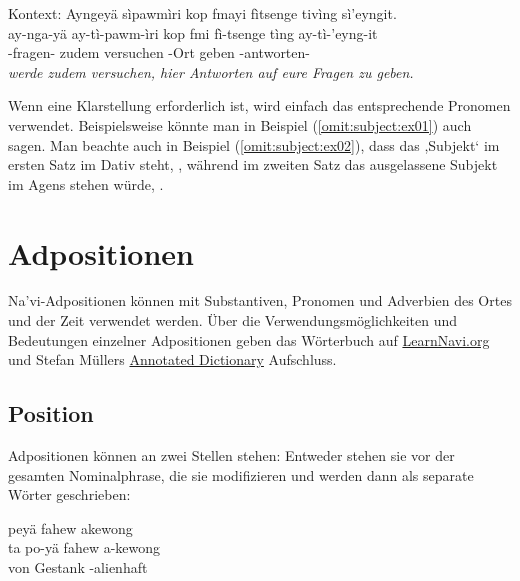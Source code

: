 \begin{interlin}
	Kontext:   
	\glll \Npawl{}Ayngeyä sìpawmìri kop fmayi fìtsenge tivìng sì'eyngit. \\
	ay-nga-yä ay-tì-pawm-ìri kop fmi fì-tsenge tìng ay-tì-'eyng-it \\
	 -fragen- zudem versuchen -Ort geben -antworten- \\
	\vskip-4pt\textit{ werde zudem versuchen, hier Antworten auf eure Fragen zu geben.}
\end{interlin}

\noindent Wenn eine Klarstellung erforderlich ist, wird einfach das entsprechende Pronomen verwendet. Beispielsweise könnte man in Beispiel (\ref{omit:subject:ex01}) auch  sagen. Man beachte auch in Beispiel (\ref{omit:subject:ex02}), dass das ,Subjekt‘ im ersten Satz im Dativ steht, , während im zweiten Satz das ausgelassene Subjekt im Agens stehen würde, .


\section{Adpositionen}
\noindent Na'vi-Adpositionen können mit Substantiven, Pronomen und Adverbien des Ortes und der Zeit verwendet werden. Über die Verwendungsmöglichkeiten und Bedeutungen einzelner Adpositionen geben das Wörterbuch auf \href{https://learnnavi.org/navi-vocabulary/}{LearnNavi.org} und Stefan Müllers \href{https://forum.learnnavi.org/index.php?msg=613941}{Annotated Dictionary} Aufschluss.

\subsection{Position} Adpositionen können an zwei Stellen stehen: Entweder stehen sie vor der gesamten Nominalphrase, die sie modifizieren und werden dann als separate Wörter geschrieben: 

\begin{interlin}
	\glll \Nfilm{} peyä fahew akewong \\
	ta po-yä fahew a-kewong \\
	von  Gestank -alienhaft \\
\end{interlin}

